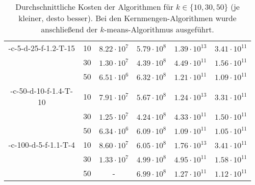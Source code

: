 \begin{table}[h]
\begin{tabular}{@{}cccccc@{}}
	\KCsTwo-c-5-d-25-f-1.2-T-15	& 10 & $8.22 \cdot 10^7$ & $5.79 \cdot 10^8$ & $1.39 \cdot 10^{13}$ & $3.41 \cdot 10^{11}$ \\
			 					& 30 & $1.30 \cdot 10^7$ & $4.39 \cdot 10^8$ & $4.49 \cdot 10^{11}$ & $1.56 \cdot 10^{11}$ \\
		 						& 50 & $6.51 \cdot 10^6$ & $6.32 \cdot 10^8$ & $1.21 \cdot 10^{11}$ & $1.09 \cdot 10^{11}$ \\
	\midrule
	\KCsTwo-c-50-d-10-f-1.4-T-10& 10 & $7.91 \cdot 10^7$ & $5.67 \cdot 10^8$ & $1.24 \cdot 10^{13}$ & $3.31 \cdot 10^{11}$ \\
			 					& 30 & $1.25 \cdot 10^7$ & $4.24 \cdot 10^8$ & $4.33 \cdot 10^{11}$ & $1.50 \cdot 10^{11}$ \\
		 						& 50 & $6.34 \cdot 10^6$ & $6.09 \cdot 10^8$ & $1.09 \cdot 10^{11}$ & $1.05 \cdot 10^{11}$ \\
	\midrule
	\KCsTwo-c-100-d-5-f-1.1-T-4	& 10 & $8.60 \cdot 10^7$ & $6.05 \cdot 10^8$ & $1.76 \cdot 10^{13}$ & $3.41 \cdot 10^{11}$ \\
			 					& 30 & $1.33 \cdot 10^7$ & $4.99 \cdot 10^8$ & $4.95 \cdot 10^{11}$ & $1.58 \cdot 10^{11}$ \\
		 						& 50 & - 				& $6.99 \cdot 10^8$ & $1.27 \cdot 10^{11}$ & $1.12 \cdot 10^{11}$ \\
	\bottomrule
\end{tabular}
\caption{Durchschnittliche Kosten der Algorithmen für $k \in \{ 10, 30, 50 \}$ (je kleiner, desto besser). Bei den Kernmengen-Algorithmen
wurde anschließend der $k$-means-Algorithmus ausgeführt.}
\label{tbl:experiment-coresets-kernel-costs-kmeans}
\end{table}
\newpage
